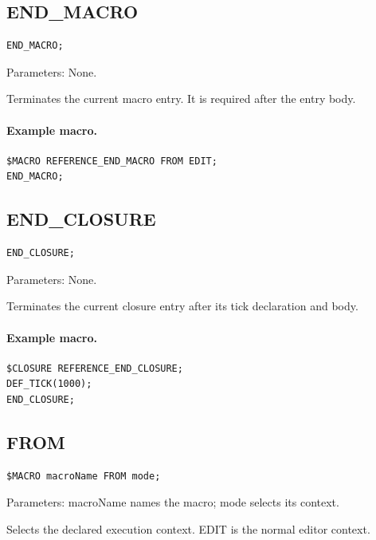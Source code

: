 \documentclass[a4paper,10pt,twoside,openany]{book}
\newenvironment{mrmacextension}{\begin{changebar}}{\end{changebar}}
\begin{document}
\label{prim:keyword-end-macro}
\subsection*{END\_MACRO}
\begin{verbatim}
END_MACRO;
\end{verbatim}
Parameters: None.

Terminates the current macro entry. It is required after the entry body.

\paragraph{Example macro.}
\begin{verbatim}
$MACRO REFERENCE_END_MACRO FROM EDIT;
END_MACRO;
\end{verbatim}

\begin{mrmacextension}
\label{prim:keyword-end-closure}
\subsection*{END\_CLOSURE}
\begin{verbatim}
END_CLOSURE;
\end{verbatim}
Parameters: None.

Terminates the current closure entry after its tick declaration and body.

\paragraph{Example macro.}
\begin{verbatim}
$CLOSURE REFERENCE_END_CLOSURE;
DEF_TICK(1000);
END_CLOSURE;
\end{verbatim}
\end{mrmacextension}

\label{prim:keyword-from}
\subsection*{FROM}
\begin{verbatim}
$MACRO macroName FROM mode;
\end{verbatim}
Parameters: macroName names the macro; mode selects its context.

Selects the declared execution context. EDIT is the normal editor context.
\end{document}
